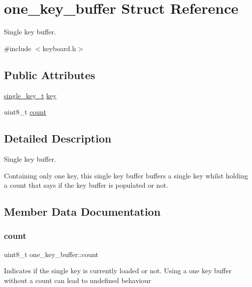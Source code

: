 \hypertarget{structone__key__buffer}{}\section{one\+\_\+key\+\_\+buffer Struct Reference}
\label{structone__key__buffer}


Single key buffer.  




{\ttfamily \#include $<$keyboard.\+h$>$}

\subsection*{Public Attributes}
\begin{DoxyCompactItemize}
\item 
\hyperlink{keyboard_8h_aa504c5d09bf7cea600b72b6003a8772c}{single\+\_\+key\+\_\+t} \hyperlink{structone__key__buffer_a8fafce124e38ced389393c68c1719c62}{key}
\item 
uint8\+\_\+t \hyperlink{structone__key__buffer_af56652a957a49467fb8aa65a5e03f372}{count}
\end{DoxyCompactItemize}


\subsection{Detailed Description}
Single key buffer. 

Containing only one key, this single key buffer buffers a single key whilst holding a count that says if the key buffer is populated or not. 

\subsection{Member Data Documentation}
\mbox{\label{structone__key__buffer_af56652a957a49467fb8aa65a5e03f372}} 
\subsubsection{\texorpdfstring{count}{count}}
{\footnotesize\ttfamily uint8\+\_\+t one\+\_\+key\+\_\+buffer\+::count}

Indicates if the single key is currently loaded or not. Using a one key buffer without a count can lead to undefined behaviour \mbox{\label{structone__key__buffer_a8fafce124e38ced389393c68c1719c62}} 

